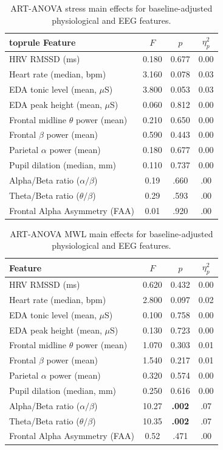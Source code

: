 \documentclass[lettersize,journal]{IEEEtran}
\begin{document}
\begin{table}[!t]
\centering
\caption{ART-ANOVA stress main effects for baseline-adjusted physiological and EEG features.}
\label{tab:anova_art_stress}
\begin{tabular}{lccc}
            \csname toprule\endcsname
Feature & $F$ & $p$ & $\eta^2_{p}$ \\
\midrule
HRV RMSSD (ms) & 0.180 & 0.677 & 0.00 \\
Heart rate (median, bpm) & 3.160 & 0.078 & 0.03 \\
EDA tonic level (mean, $\mu$S) & 3.800 & 0.053 & 0.03 \\
EDA peak height (mean, $\mu$S) & 0.060 & 0.812 & 0.00 \\
Frontal midline $\theta$ power (mean) & 0.210 & 0.650 & 0.00 \\
Frontal $\beta$ power (mean) & 0.590 & 0.443 & 0.00 \\
Parietal $\alpha$ power (mean) & 0.180 & 0.677 & 0.00 \\
Pupil dilation (median, mm) & 0.110 & 0.737 & 0.00 \\
Alpha/Beta ratio ($\alpha/\beta$) & 0.19 & .660 & .00 \\
Theta/Beta ratio ($\theta/\beta$) & 0.29 & .593 & .00 \\
Frontal Alpha Asymmetry (FAA) & 0.01 & .920 & .00 \\
\bottomrule
\end{tabular}
\end{table}


\begin{table}[!t]
\centering
\caption{ART-ANOVA MWL main effects for baseline-adjusted physiological and EEG features.}
\label{tab:anova_art_workload}
\begin{tabular}{lccc}
\toprule
Feature & $F$ & $p$ & $\eta^2_{p}$ \\
\midrule
HRV RMSSD (ms) & 0.620 & 0.432 & 0.00 \\
Heart rate (median, bpm) & 2.800 & 0.097 & 0.02 \\
EDA tonic level (mean, $\mu$S) & 0.100 & 0.758 & 0.00 \\
EDA peak height (mean, $\mu$S) & 0.130 & 0.723 & 0.00 \\
Frontal midline $\theta$ power (mean) & 1.070 & 0.303 & 0.01 \\
Frontal $\beta$ power (mean) & 1.540 & 0.217 & 0.01 \\
Parietal $\alpha$ power (mean) & 0.320 & 0.574 & 0.00 \\
Pupil dilation (median, mm) & 0.250 & 0.616 & 0.00 \\
Alpha/Beta ratio ($\alpha/\beta$) & 10.27 & \textbf{.002} & .07 \\
Theta/Beta ratio ($\theta/\beta$) & 10.35 & \textbf{.002} & .07 \\
Frontal Alpha Asymmetry (FAA) & 0.52 & .471 & .00 \\
\bottomrule
\end{tabular}
\end{table}
\end{document}
